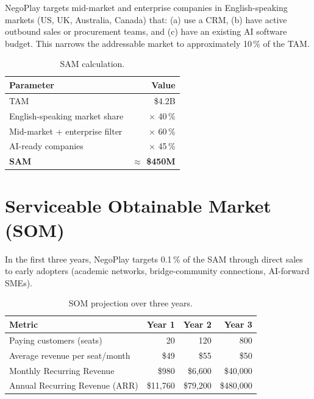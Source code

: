 \documentclass[11pt, a4paper, oneside]{report}
\begin{document}
NegoPlay targets mid-market and enterprise companies in English-speaking
markets (US, UK, Australia, Canada) that: (a) use a CRM, (b) have
active outbound sales or procurement teams, and (c) have an existing AI
software budget. This narrows the addressable market to approximately
10\,\% of the TAM.

\begin{table}[H]
\centering\small
\caption{SAM calculation.}
\begin{tabular}{lr}
\toprule
\textbf{Parameter}                 & \textbf{Value} \\
\midrule
TAM                                & \$4.2B \\
English-speaking market share      & $\times$ 40\,\% \\
Mid-market + enterprise filter     & $\times$ 60\,\% \\
AI-ready companies                 & $\times$ 45\,\% \\
\midrule
\textbf{SAM}                       & \textbf{$\approx$ \$450M} \\
\bottomrule
\end{tabular}
\end{table}

\section{Serviceable Obtainable Market (SOM)}

In the first three years, NegoPlay targets 0.1\,\% of the SAM through
direct sales to early adopters (academic networks, bridge-community
connections, AI-forward SMEs).

\begin{table}[H]
\centering\small
\caption{SOM projection over three years.}
\begin{tabular}{lrrr}
\toprule
\textbf{Metric}               & \textbf{Year 1} & \textbf{Year 2} & \textbf{Year 3} \\
\midrule
Paying customers (seats)      & 20              & 120             & 800 \\
Average revenue per seat/month & \$49           & \$55            & \$50 \\
Monthly Recurring Revenue     & \$980           & \$6{,}600       & \$40{,}000 \\
Annual Recurring Revenue (ARR) & \$11{,}760     & \$79{,}200      & \$480{,}000 \\
\bottomrule
\end{tabular}
\end{table}
\end{document}
